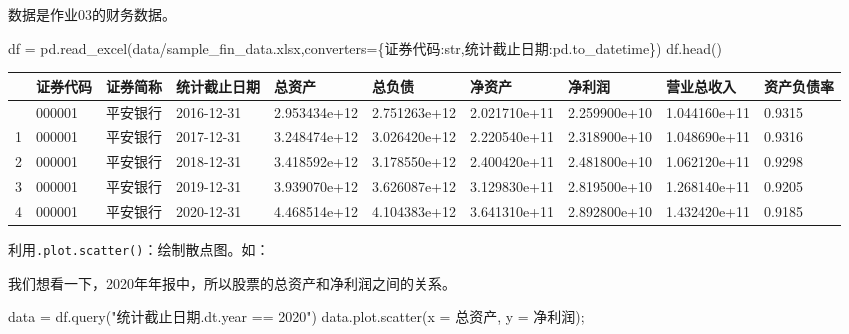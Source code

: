 \documentclass[
  letterpaper,
  DIV=11,
  numbers=noendperiod]{scrreprt}
\newenvironment{Shaded}{\begin{snugshade}}{\end{snugshade}}
\newcommand{\BuiltInTok}[1]{\textcolor[rgb]{0.00,0.23,0.31}{#1}}
\newcommand{\NormalTok}[1]{\textcolor[rgb]{0.00,0.23,0.31}{#1}}
\newcommand{\OperatorTok}[1]{\textcolor[rgb]{0.37,0.37,0.37}{#1}}
\newcommand{\StringTok}[1]{\textcolor[rgb]{0.13,0.47,0.30}{#1}}
\begin{document}
数据是作业03的财务数据。

\begin{Shaded}
\begin{Highlighting}[]
\NormalTok{df }\OperatorTok{=}\NormalTok{ pd.read\_excel(}\StringTok{\textquotesingle{}data/sample\_fin\_data.xlsx\textquotesingle{}}\NormalTok{,converters}\OperatorTok{=}\NormalTok{\{}\StringTok{\textquotesingle{}证券代码\textquotesingle{}}\NormalTok{:}\BuiltInTok{str}\NormalTok{,}\StringTok{\textquotesingle{}统计截止日期\textquotesingle{}}\NormalTok{:pd.to\_datetime\})}
\NormalTok{df.head()}
\end{Highlighting}
\end{Shaded}

\begin{longtable}[]{@{}llllllllll@{}}
\toprule\noalign{}
& 证券代码 & 证券简称 & 统计截止日期 & 总资产 & 总负债 & 净资产 & 净利润
& 营业总收入 & 资产负债率 \\
\midrule\noalign{}
\endhead
\bottomrule\noalign{}
\endlastfoot
0 & 000001 & 平安银行 & 2016-12-31 & 2.953434e+12 & 2.751263e+12 &
2.021710e+11 & 2.259900e+10 & 1.044160e+11 & 0.9315 \\
1 & 000001 & 平安银行 & 2017-12-31 & 3.248474e+12 & 3.026420e+12 &
2.220540e+11 & 2.318900e+10 & 1.048690e+11 & 0.9316 \\
2 & 000001 & 平安银行 & 2018-12-31 & 3.418592e+12 & 3.178550e+12 &
2.400420e+11 & 2.481800e+10 & 1.062120e+11 & 0.9298 \\
3 & 000001 & 平安银行 & 2019-12-31 & 3.939070e+12 & 3.626087e+12 &
3.129830e+11 & 2.819500e+10 & 1.268140e+11 & 0.9205 \\
4 & 000001 & 平安银行 & 2020-12-31 & 4.468514e+12 & 4.104383e+12 &
3.641310e+11 & 2.892800e+10 & 1.432420e+11 & 0.9185 \\
\end{longtable}

利用\texttt{.plot.scatter()}：绘制散点图。如：

我们想看一下，2020年年报中，所以股票的总资产和净利润之间的关系。

\begin{Shaded}
\begin{Highlighting}[]
\NormalTok{data }\OperatorTok{=}\NormalTok{ df.query(}\StringTok{"统计截止日期.dt.year == 2020"}\NormalTok{)}
\NormalTok{data.plot.scatter(x }\OperatorTok{=} \StringTok{\textquotesingle{}总资产\textquotesingle{}}\NormalTok{, y }\OperatorTok{=} \StringTok{\textquotesingle{}净利润\textquotesingle{}}\NormalTok{)}\OperatorTok{;}
\end{Highlighting}
\end{Shaded}
\end{document}
